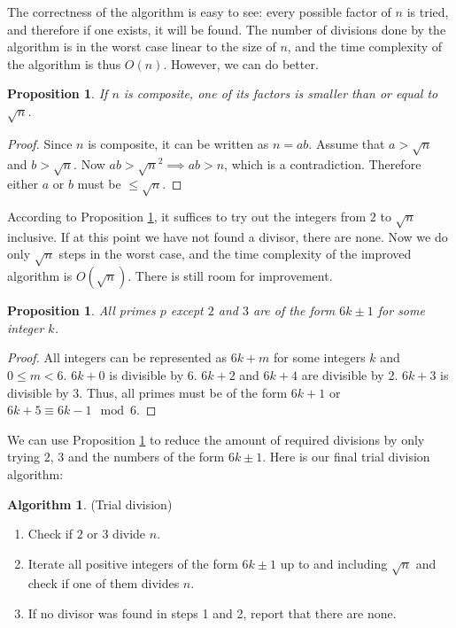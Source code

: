 \documentclass[12pt] {article}
\theoremstyle{plain}
\newtheorem{prop}[thm]{Proposition}
\theoremstyle{definition}
\newtheorem{algo}[thm]{Algorithm}
\begin{document}
The correctness of the algorithm is easy to see: every possible factor of $n$ is tried, and therefore if one exists, it will be found. The number of divisions done by the algorithm is in the worst case linear to the size of $n$, and the time complexity of the algorithm is thus $O(n)$. However, we can do better.

\begin{prop}
\label {prop:factupperbound}
If $n$ is composite, one of its factors is smaller than or equal to $\sqrt{n}$.
\end{prop}

\begin{proof}
Since $n$ is composite, it can be written as $n = ab$. Assume that $a > \sqrt{n}$ and $b > \sqrt{n}$. Now $ab > \sqrt{n}^2 \implies ab > n$, which is a contradiction. Therefore either $a$ or $b$ must be $\leq \sqrt{n}$.
\end{proof}

According to Proposition \ref{prop:factupperbound}, it suffices to try out the integers from $2$ to $\sqrt{n}$ inclusive. If at this point we have not found a divisor, there are none. Now we do only $\sqrt{n}$ steps in the worst case, and the time complexity of the improved algorithm is $O(\sqrt{n})$. There is still room for improvement.

\begin{prop}
\label {prop:primes6pm1}
All primes $p$ except $2$ and $3$ are of the form $6k \pm 1$ for some integer $k$.
\end{prop}

\begin{proof}
All integers can be represented as $6k + m$ for some integers $k$ and $0 \leq m < 6$. $6k + 0$ is divisible by 6. $6k + 2$ and $6k + 4$ are divisible by 2. $6k + 3$ is divisible by 3. Thus, all primes must be of the form $6k + 1$ or $6k + 5 \equiv 6k - 1 \mod 6$.
\end{proof}

We can use Proposition \ref{prop:primes6pm1} to reduce the amount of required divisions by only trying $2$, $3$ and the numbers of the form $6k \pm 1$. Here is our final trial division algorithm:
\begin{algo} (Trial division)
\begin{enumerate}
\item Check if $2$ or $3$ divide $n$.
\item Iterate all positive integers of the form $6k \pm 1$ up to and including $\sqrt{n}$ and check if one of them divides $n$.
\item If no divisor was found in steps 1 and 2, report that there are none.
\end{enumerate}
\end{algo}
\end{document}
